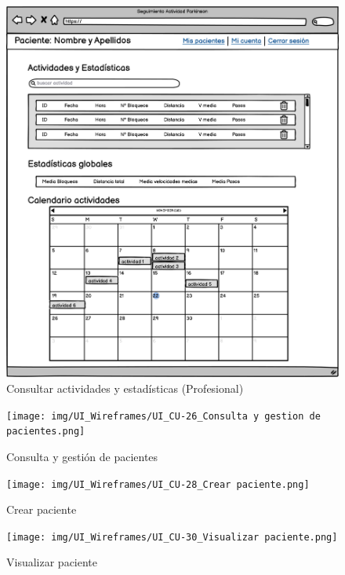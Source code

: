 \begin{figure}[h]
    \centering
    \includegraphics[width=1\textwidth]{img/UI_Wireframes/UI_CU-23_Prof-Consultar actividades y estadísticas.png}
    \caption{Consultar actividades y estadísticas (Profesional)}
    \label{fig:Consultar actividades y estadísticas (Profesional)}
\end{figure}

\begin{figure}[h]
    \centering
    \texttt{[image: img/UI\_Wireframes/UI\_CU-26\_Consulta y gestion de pacientes.png]}
    \caption{Consulta y gestión de pacientes}
    \label{fig:Consulta y gestión de pacientes}
\end{figure}

\begin{figure}[h]
    \centering
    \texttt{[image: img/UI\_Wireframes/UI\_CU-28\_Crear paciente.png]}
    \caption{Crear paciente}
    \label{fig:Crear paciente}
\end{figure}

\begin{figure}[h]
    \centering
    \texttt{[image: img/UI\_Wireframes/UI\_CU-30\_Visualizar paciente.png]}
    \caption{Visualizar paciente}
    \label{fig:Visualizar paciente}
\end{figure}